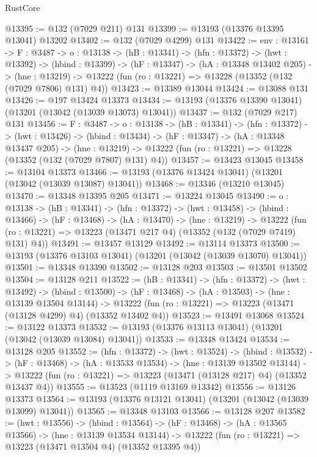 \begin{lexlean}{RustCore}
\begin{coremodule}
@13395 := @132 (@7029 @211) @131
@13399 := @13193 (@13376 @13395 @13041) @13202
@13402 := @132 (@7029 @4299) @131
@13422 := {env : @13161} ->
  {F : @3487} ->
  {o : @13138} ->
  (hB : @13341) ->
  (hfn : @13372) ->
  (hwt : @13392) ->
  (hbind : @13399) ->
  (hF : @13347) ->
  (hA : @13348 @13402 @205) ->
  (hne : @13219) -> @13222 (fun (ro : @13221) => @13228 (@13352 (@132 (@7029 @7806) @131) @4))
@13423 := @13389 @13044
@13424 := @13088 @131
@13426 := @197 @13424 @13373
@13434 := @13193 (@13376 @13390 @13041) (@13201 (@13042 (@13039 @13073) @13041))
@13437 := @132 (@7029 @217) @131
@13456 := {F : @3487} ->
  {o : @13138} ->
  (hB : @13341) ->
  (hfn : @13372) ->
  (hwt : @13426) ->
  (hbind : @13434) ->
  (hF : @13347) ->
  (hA : @13348 @13437 @205) ->
  (hne : @13219) -> @13222 (fun (ro : @13221) => @13228 (@13352 (@132 (@7029 @7807) @131) @4))
@13457 := @13423 @13045
@13458 := @13104 @13373
@13466 := @13193 (@13376 @13424 @13041) (@13201 (@13042 (@13039 @13087) @13041))
@13468 := @13346 (@13210 @13045)
@13470 := @13348 @13395 @205
@13471 := @13224 @13045
@13490 := {o : @13138} ->
  (hB : @13341) ->
  (hfn : @13372) ->
  (hwt : @13458) ->
  (hbind : @13466) ->
  (hF : @13468) ->
  (hA : @13470) ->
  (hne : @13219) ->
  @13222 (fun (ro : @13221) => @13223 (@13471 @217 @4) (@13352 (@132 (@7029 @7419) @131) @4))
@13491 := @13457 @13129
@13492 := @13114 @13373
@13500 := @13193 (@13376 @13103 @13041) (@13201 (@13042 (@13039 @13070) @13041))
@13501 := @13348 @13390
@13502 := @13128 @203
@13503 := @13501 @13502
@13504 := @13128 @211
@13522 := (hB : @13341) ->
  (hfn : @13372) ->
  (hwt : @13492) ->
  (hbind : @13500) ->
  (hF : @13468) ->
  (hA : @13503) ->
  (hne : @13139 @13504 @13144) ->
  @13222 (fun (ro : @13221) => @13223 (@13471 (@13128 @4299) @4) (@13352 @13402 @4))
@13523 := @13491 @13068
@13524 := @13122 @13373
@13532 := @13193 (@13376 @13113 @13041) (@13201 (@13042 (@13039 @13084) @13041))
@13533 := @13348 @13424
@13534 := @13128 @205
@13552 := (hfn : @13372) ->
  (hwt : @13524) ->
  (hbind : @13532) ->
  (hF : @13468) ->
  (hA : @13533 @13534) ->
  (hne : @13139 @13502 @13144) ->
  @13222 (fun (ro : @13221) => @13223 (@13471 (@13128 @217) @4) (@13352 @13437 @4))
@13555 := @13523 (@1119 @13169 @13342)
@13556 := @13126 @13373
@13564 := @13193 (@13376 @13121 @13041) (@13201 (@13042 (@13039 @13099) @13041))
@13565 := @13348 @13103
@13566 := @13128 @207
@13582 := (hwt : @13556) ->
  (hbind : @13564) ->
  (hF : @13468) ->
  (hA : @13565 @13566) ->
  (hne : @13139 @13534 @13144) ->
  @13222 (fun (ro : @13221) => @13223 (@13471 @13504 @4) (@13352 @13395 @4))

\end{coremodule}
\end{lexlean}

